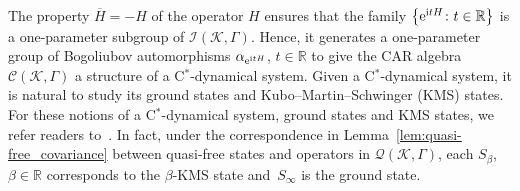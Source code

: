 \documentclass[pdftex]{sigma}
\numberwithin{equation}{section}
\newcommand{\mcal}[1]{\mathcal{#1}}
\newcommand{\mbb}[1]{\mathbb{#1}}
\begin{document}
\begin{Remark}
The property $\overline{H}=-H$ of the operator $H$ ensures that the family $\big\{{\rm e}^{{\rm i}tH}\colon t\in\mbb{R}\big\}$ is a one-parameter subgroup of $\mcal{I}(\mcal{K},\Gamma)$. Hence, it generates a one-parameter group of Bogoliubov automorphisms $\alpha_{{\rm e}^{{\rm i}tH}}$, $t\in\mbb{R}$ to give the CAR algebra $\mcal{C}(\mcal{K},\Gamma)$ a structure of a C$^{\ast}$-dynamical system.
Given a C$^{\ast}$-dynamical system, it is natural to study its ground states and Kubo--Martin--Schwinger (KMS) states.
For these notions of a C$^{\ast}$-dynamical system, ground states and KMS states, we refer readers to~\cite[Chapter~5.2]{BratteliRobinson1997}.
In fact, under the correspondence in Lemma~\ref{lem:quasi-free_covariance} between quasi-free states and operators in $\mcal{Q}(\mcal{K},\Gamma)$, each $S_{\beta}$, $\beta\in \mbb{R}$ corresponds to the $\beta$-KMS state and~$S_{\infty}$ is the ground state.
\end{Remark}
\end{document}
